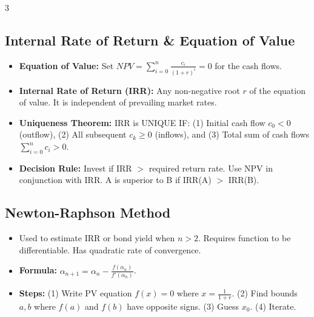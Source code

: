 \documentclass[8pt,a4paper,landscape]{extarticle}
\begin{document}
\begin{multicols*}{3}
    \subsection{Internal Rate of Return \& Equation of Value}
    \begin{itemize}
        \item \textbf{Equation of Value:} Set $NPV = \sum_{i = 0}^{n}\frac{c_i}{(1 + r)^{i}} = 0 $ for the cash flows.
        \item \textbf{Internal Rate of Return (IRR):} Any non-negative root $r$ of the equation of value. It is independent of prevailing market rates.
        \item \textbf{Uniqueness Theorem:} IRR is UNIQUE IF: (1) Initial cash flow $c_0 < 0$ (outflow), (2) All subsequent $c_k \ge 0$ (inflows), and (3) Total sum of cash flows $\sum_{i = 0}^{n}c_i > 0$.
        \item \textbf{Decision Rule:} Invest if IRR $>$ required return rate. Use NPV in conjunction with IRR. A is superior to B if IRR(A) $>$ IRR(B).
    \end{itemize}

    \subsection{Newton-Raphson Method}
    \begin{itemize}
        \item Used to estimate IRR or bond yield when $n > 2$. Requires function to be differentiable. Has quadratic rate of convergence.
        \item \textbf{Formula:} $\alpha_{n+1} = \alpha_n - \frac{f(\alpha_n)}{f'(\alpha_n)}$.
        \item \textbf{Steps:} (1) Write PV equation $f(x)=0$ where $x = \frac{1}{1+r}$. (2) Find bounds $a,b$ where $f(a)$ and $f(b)$ have opposite signs. (3) Guess $x_0$. (4) Iterate.
    \end{itemize}


\end{multicols*}
\end{document}
